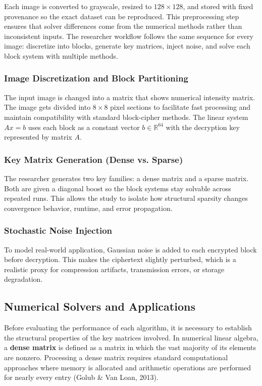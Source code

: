 \documentclass[11pt]{article}
\begin{document}
Each image is converted to grayscale, resized to $128 \times 128$, and stored with fixed provenance so the exact dataset can be reproduced. This preprocessing step ensures that solver differences come from the numerical methods rather than inconsistent inputs. The researcher workflow follows the same sequence for every image: discretize into blocks, generate key matrices, inject noise, and solve each block system with multiple methods.

\subsubsection{Image Discretization and Block Partitioning}
The input image is changed into a matrix that shows numerical intensity matrix. The image gets divided into $8 \times 8$ pixel sections to facilitate fast processing and maintain compatibility with standard block-cipher methods. The linear system $Ax = b$ uses each block as a constant vector $b \in \mathbb{R}^{64}$ with the decryption key represented by matrix $A$.

\subsubsection{Key Matrix Generation (Dense vs. Sparse)}
The researcher generates two key families: a dense matrix and a sparse matrix. Both are given a diagonal boost so the block systems stay solvable across repeated runs. This allows the study to isolate how structural sparsity changes convergence behavior, runtime, and error propagation.

\subsubsection{Stochastic Noise Injection}
To model real-world application, Gaussian noise is added to each encrypted block before decryption. This makes the ciphertext slightly perturbed, which is a realistic proxy for compression artifacts, transmission errors, or storage degradation. 

\subsection{Numerical Solvers and Applications}
Before evaluating the performance of each algorithm, it is necessary to establish the structural properties of the key matrices involved. In numerical linear algebra, a \textbf{dense matrix} is defined as a matrix in which the vast majority of its elements are nonzero. Processing a dense matrix requires standard computational approaches where memory is allocated and arithmetic operations are performed for nearly every entry (Golub \& Van Loan, 2013). 
\end{document}

